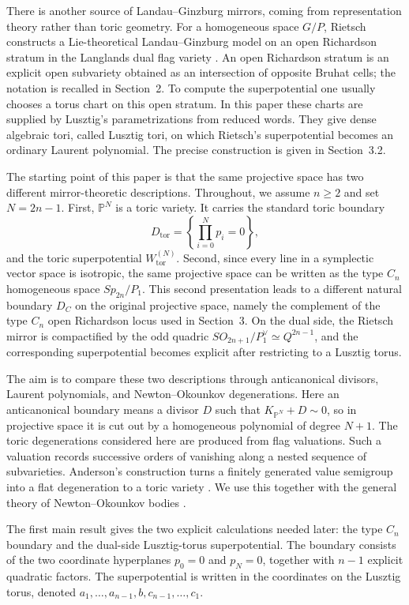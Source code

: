 \documentclass{article}
\newcommand{\PP}{\mathbb{P}}
\begin{document}
There is another source of Landau--Ginzburg mirrors, coming from representation theory rather than toric geometry. For a homogeneous space \(G/P\), Rietsch constructs a Lie-theoretical Landau--Ginzburg model on an open Richardson stratum in the Langlands dual flag variety \cite{Rietsch}. An open Richardson stratum is an explicit open subvariety obtained as an intersection of opposite Bruhat cells; the notation is recalled in Section~2. To compute the superpotential one usually chooses a torus chart on this open stratum. In this paper these charts are supplied by Lusztig's parametrizations from reduced words. They give dense algebraic tori, called Lusztig tori, on which Rietsch's superpotential becomes an ordinary Laurent polynomial. The precise construction is given in Section~3.2.

The starting point of this paper is that the same projective space has two different mirror-theoretic descriptions. Throughout, we assume \(n\ge2\) and set \(N=2n-1\). First, \(\PP^N\) is a toric variety. It carries the standard toric boundary
\[
D_{\mathrm{tor}}=\left\{\prod_{i=0}^Np_i=0\right\},
\]
and the toric superpotential \(W_{\mathrm{tor}}^{(N)}\). Second, since every line in a symplectic vector space is isotropic, the same projective space can be written as the type \(C_n\) homogeneous space \(Sp_{2n}/P_1\). This second presentation leads to a different natural boundary \(D_C\) on the original projective space, namely the complement of the type \(C_n\) open Richardson locus used in Section~3. On the dual side, the Rietsch mirror is compactified by the odd quadric \(SO_{2n+1}/P_1^\vee\simeq Q^{2n-1}\), and the corresponding superpotential becomes explicit after restricting to a Lusztig torus.

The aim is to compare these two descriptions through anticanonical divisors, Laurent polynomials, and Newton--Okounkov degenerations. Here an anticanonical boundary means a divisor \(D\) such that \(K_{\PP^N}+D\sim0\), so in projective space it is cut out by a homogeneous polynomial of degree \(N+1\). The toric degenerations considered here are produced from flag valuations. Such a valuation records successive orders of vanishing along a nested sequence of subvarieties. Anderson's construction turns a finitely generated value semigroup into a flat degeneration to a toric variety \cite{Anderson}. We use this together with the general theory of Newton--Okounkov bodies \cite{KK,LM}.

The first main result gives the two explicit calculations needed later: the type \(C_n\) boundary and the dual-side Lusztig-torus superpotential. The boundary consists of the two coordinate hyperplanes \(p_0=0\) and \(p_N=0\), together with \(n-1\) explicit quadratic factors. The superpotential is written in the coordinates on the Lusztig torus, denoted \(a_1,\ldots,a_{n-1},b,c_{n-1},\ldots,c_1\).
\end{document}
